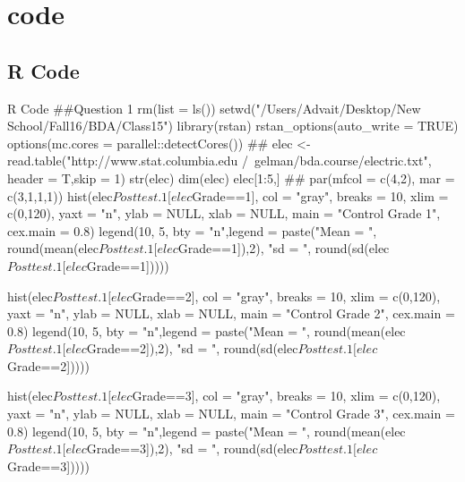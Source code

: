 \documentclass{article}
\begin{document}
\section{code}
\subsection{R Code}
\begin{sexylisting}{R Code}
##Question 1
rm(list = ls())
setwd("/Users/Advait/Desktop/New School/Fall16/BDA/Class15")
library(rstan)
rstan_options(auto_write = TRUE)
options(mc.cores = parallel::detectCores())
##
elec <- read.table("http://www.stat.columbia.edu
/~gelman/bda.course/electric.txt", header = T,skip  = 1)
str(elec)
dim(elec)
elec[1:5,]
##
par(mfcol = c(4,2), mar = c(3,1,1,1))
hist(elec$Posttest.1[elec$Grade==1], col = "gray", 
     breaks = 10, xlim = c(0,120), 
     yaxt = "n", ylab = NULL,
     xlab = NULL, main = "Control Grade 1",
     cex.main = 0.8)
legend(10, 5, bty = "n",legend = paste("Mean = ", 
round(mean(elec$Posttest.1[elec$Grade==1]),2), "\n sd = ", 
round(sd(elec$Posttest.1[elec$Grade==1]))))

hist(elec$Posttest.1[elec$Grade==2], col = "gray", 
     breaks = 10, xlim = c(0,120), yaxt = "n", 
     ylab = NULL, xlab = NULL, main = "Control Grade 2",
     cex.main = 0.8)
legend(10, 5, bty = "n",legend = paste("Mean = ", 
round(mean(elec$Posttest.1[elec$Grade==2]),2), "\n sd = ", 
round(sd(elec$Posttest.1[elec$Grade==2]))))

hist(elec$Posttest.1[elec$Grade==3], col = "gray", breaks = 10, 
xlim = c(0,120), yaxt = "n", ylab = NULL, 
xlab = NULL, main = "Control Grade 3",
     cex.main = 0.8)
legend(10, 5, bty = "n",legend = paste("Mean = ", 
round(mean(elec$Posttest.1[elec$Grade==3]),2), "\n sd = ", 
round(sd(elec$Posttest.1[elec$Grade==3]))))
\end{sexylisting}
\end{document}
